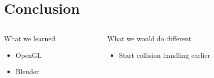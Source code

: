 \section{Conclusion}
\begin{frame}
	\begin{columns}[t]
		\begin{column}{0.5\textwidth}
			\begin{block}{What we learned}
				\begin{itemize}
					\item OpenGL
					\item Blender
				\end{itemize}
			\end{block}
		\end{column}
		\pause
		\begin{column}{0.5\textwidth}
			\begin{block}{What we would do different}
				\begin{itemize}
					\item Start collision handling earlier
				\end{itemize}
			\end{block}
		\end{column}
	\end{columns}
\end{frame}
